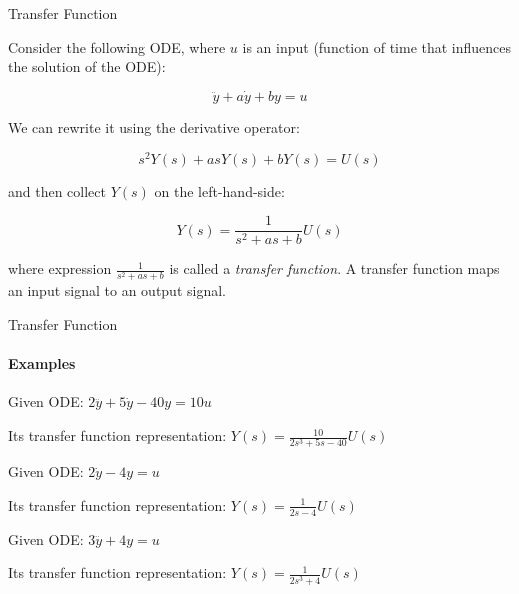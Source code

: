 \documentclass{beamer}
\begin{document}
\begin{frame}{Transfer Function}
\begin{flushleft}

Consider the following ODE, where $u$ is an input (function of time that influences the solution of the ODE):

\begin{equation}
\ddot y + a \dot y + b y = u
\end{equation}

We can rewrite it using the derivative operator:

\begin{equation}
s^2 Y(s) + a s Y(s) + b Y(s) = U(s)
\end{equation}

and then collect $Y(s)$ on the left-hand-side:

\begin{equation}
Y(s) = \frac{1}{s^2 + a s + b} U(s)
\end{equation}

where expression $\frac{1}{s^2 + a s + b}$ is called a \emph{transfer function}. A transfer function maps an input signal to an output signal.

\end{flushleft}
\end{frame}


\begin{frame}{Transfer Function}
\framesubtitle{Examples}
\begin{flushleft}

\begin{example}
Given ODE: $2 \dddot y + 5\dot y - 40 y = 10 u$

Its transfer function representation: 
$Y(s)  = \frac{10}{2 s^3 + 5 s - 40} U(s)$
\end{example}


\begin{example}
Given ODE: $2 \dot y - 4 y = u$

Its transfer function representation:  $Y(s) = \frac{1}{2 s - 4} U(s)$
\end{example}


\begin{example}
Given ODE: $3 \dddot y + 4y = u$

Its transfer function representation: $Y(s) = \frac{1}{2 s^3 + 4} U(s)$
\end{example}

\end{flushleft}
\end{frame}
\end{document}
